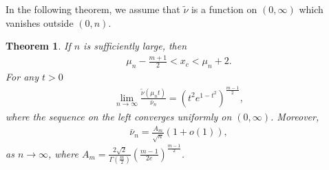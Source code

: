 \documentclass[10pt]{amsart}
\newtheorem{theorem}{Theorem}
\theoremstyle{remark}
\let\td=\tilde
\begin{document}
In the following theorem, we assume that $\td\nu$ is a function on
$(0,\infty)$ which vanishes outside $(0,n)$.
\begin{theorem}\label{limitnu}
If $n$ is sufficiently large, then
\begin{eqnarray}\label{betwe}
\mu_n-\frac{m+1}{2}<x_c<\mu_n+2.
\end{eqnarray}
For any $t>0$
\begin{eqnarray}\label{limnumu}
\lim_{n\to\infty}\frac{\td\nu(\mu_nt)}{\bar\nu_n} =
\left(t^2e^{1-t^2}\right)^{\frac{m-1}{2}},
\end{eqnarray}
where the sequence on the left converges uniformly on
$(0,\infty)$. Moreover,
\begin{eqnarray}\label{asynun}
\bar\nu_n=\frac{A_m}{\sqrt{n}}(1+o(1)),
\end{eqnarray}
as $n\to\infty$, where
$A_m=\frac{2\sqrt{2}}{{{\mathord{\Gamma}}}\left(\frac{{m}}{2}\right)}
\left(\frac{m-1}{2e}\right)^{\frac{m-1}{2}}$.
\end{theorem}
\end{document}
